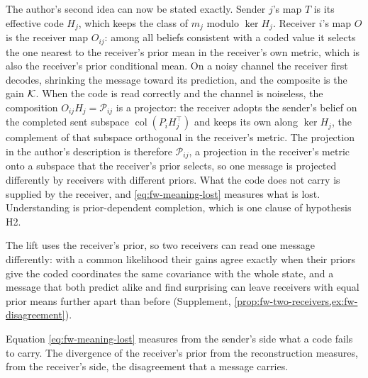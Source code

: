 The author's second idea can now be stated exactly. Sender $j$'s map $T$ is its effective code $H_j$, which keeps the class of $m_j$ modulo $\ker H_j$. Receiver $i$'s map $O$ is the receiver map $O_{ij}$: among all beliefs consistent with a coded value it selects the one nearest to the receiver's prior mean in the receiver's own metric, which is also the receiver's prior conditional mean. On a noisy channel the receiver first decodes, shrinking the message toward its prediction, and the composite is the gain $\mathcal{K}$. When the code is read correctly and the channel is noiseless, the composition $O_{ij}H_j=\mathcal P_{ij}$ is a projector: the receiver adopts the sender's belief on the completed sent subspace $\operatorname{col}(P_iH_j^\top)$ and keeps its own along $\ker H_j$, the complement of that subspace orthogonal in the receiver's metric. The projection in the author's description is therefore $\mathcal P_{ij}$, a projection in the receiver's metric onto a subspace that the receiver's prior selects, so one message is projected differently by receivers with different priors. What the code does not carry is supplied by the receiver, and \eqref{eq:fw-meaning-lost} measures what is lost. Understanding is prior-dependent completion, which is one clause of hypothesis H2.

The lift uses the receiver's prior, so two receivers can read one message differently: with a common likelihood their gains agree exactly when their priors give the coded coordinates the same covariance with the whole state, and a message that both predict alike and find surprising can leave receivers with equal prior means further apart than before (Supplement, \cref{prop:fw-two-receivers,ex:fw-disagreement}).

Equation \eqref{eq:fw-meaning-lost} measures from the sender's side what a code fails to carry. The divergence of the receiver's prior from the reconstruction measures, from the receiver's side, the disagreement that a message carries.

